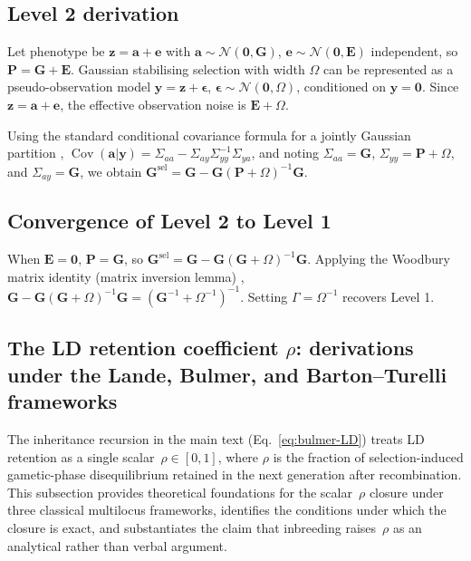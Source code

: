 \documentclass[9pt,twocolumn,twoside,lineno]{gsajnl}
\newcommand{\vect}[1]{\boldsymbol{#1}}
\newcommand{\mat}[1]{\mathbf{#1}}
\newcommand{\Gsel}{\ensuremath{\mat{G}^{\text{sel}}}\xspace}
\newcommand{\Cov}{\ensuremath{\operatorname{Cov}}\xspace}
\begin{document}
\subsection{Level 2 derivation}

Let phenotype be $\vect{z} = \vect{a} + \vect{e}$ with $\vect{a} \sim \mathcal{N}(\vect{0}, \mat{G})$, $\vect{e} \sim \mathcal{N}(\vect{0}, \mat{E})$ independent, so $\mat{P} = \mat{G} + \mat{E}$. Gaussian stabilising selection with width $\Omega$ can be represented as a pseudo-observation model $\vect{y} = \vect{z} + \vect{\epsilon}$, $\vect{\epsilon} \sim \mathcal{N}(\vect{0}, \Omega)$, conditioned on $\vect{y} = \vect{0}$. Since $\vect{z} = \vect{a} + \vect{e}$, the effective observation noise is $\mat{E} + \Omega$.

Using the standard conditional covariance formula for a jointly Gaussian partition \citep{Anderson2003}, $\Cov(\vect{a} | \vect{y}) = \Sigma_{aa} - \Sigma_{ay}\Sigma_{yy}^{-1}\Sigma_{ya}$, and noting $\Sigma_{aa} = \mat{G}$, $\Sigma_{yy} = \mat{P} + \Omega$, and $\Sigma_{ay} = \mat{G}$, we obtain $\Gsel = \mat{G} - \mat{G}(\mat{P} + \Omega)^{-1}\mat{G}$.

\subsection{Convergence of Level 2 to Level 1}

When $\mat{E} = \mat{0}$, $\mat{P} = \mat{G}$, so $\Gsel = \mat{G} - \mat{G}(\mat{G} + \Omega)^{-1}\mat{G}$. Applying the Woodbury matrix identity (matrix inversion lemma) \citep{GolubVanLoan2013}, $\mat{G} - \mat{G}(\mat{G} + \Omega)^{-1}\mat{G} = (\mat{G}^{-1} + \Omega^{-1})^{-1}$. Setting $\Gamma = \Omega^{-1}$ recovers Level 1.

\subsection{The LD retention coefficient $\rho$: derivations under the Lande, Bulmer, and Barton--Turelli frameworks}
\label{app:rho_derivations}

The inheritance recursion in the main text (Eq.~\ref{eq:bulmer-LD}) treats LD retention as a single scalar~$\rho \in [0,1]$, where $\rho$ is the fraction of selection-induced gametic-phase disequilibrium retained in the next generation after recombination. This subsection provides theoretical foundations for the scalar~$\rho$ closure under three classical multilocus frameworks, identifies the conditions under which the closure is exact, and substantiates the claim that inbreeding raises~$\rho$ as an analytical rather than verbal argument.
\end{document}
